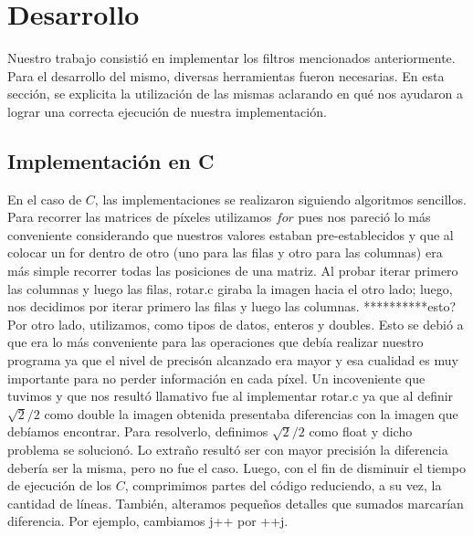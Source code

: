 \documentclass[10pt, a4paper]{article}
\begin{document}
\section{Desarrollo}
Nuestro trabajo consistió en implementar los filtros mencionados anteriormente. Para el desarrollo del mismo, diversas herramientas fueron necesarias. En esta sección, se explicita la utilización de las mismas aclarando en qué nos ayudaron a lograr una correcta ejecución de nuestra implementación.  
\subsection{Implementación en C}
En el caso de $C$, las implementaciones se realizaron siguiendo algoritmos sencillos. Para recorrer las matrices de píxeles utilizamos $for$ pues nos pareció lo más conveniente considerando que nuestros valores estaban pre-establecidos y que al colocar un for dentro de otro (uno para las filas y otro para las columnas) era más simple recorrer todas las posiciones de una matriz.\newline
Al probar iterar primero las columnas y luego las filas, rotar.c giraba la imagen hacia el otro lado; luego, nos decidimos por iterar primero las filas y luego las columnas. **********esto?
\newline
Por otro lado, utilizamos, como tipos de datos, enteros y doubles. Esto se debió a que era lo más conveniente para las operaciones que debía realizar nuestro programa ya que el nivel de precisón alcanzado era mayor y esa cualidad es muy importante para no perder información en cada píxel. Un incoveniente que tuvimos y que nos resultó llamativo fue al implementar rotar.c ya que al definir $\sqrt{2}/2$ como double la imagen obtenida presentaba diferencias con la imagen que debíamos encontrar. Para resolverlo, definimos $\sqrt{2}/2$ como float y dicho problema se solucionó. Lo extraño resultó ser con mayor precisión la diferencia debería ser la misma, pero no fue el caso.\newline
\newline
Luego, con el fin de disminuir el tiempo de ejecución de los $C$, comprimimos partes del código reduciendo, a su vez, la cantidad de líneas. También, alteramos pequeños detalles que sumados marcarían diferencia. Por ejemplo, cambiamos j++ por ++j.
\end{document}
